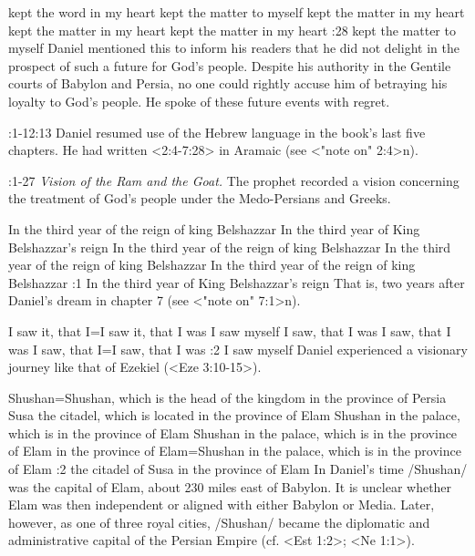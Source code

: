     {kept the word in my heart} %
    {kept the matter to myself} %
    {kept the matter in my heart} %
    {kept the matter in my heart} %
    {kept the matter in my heart} %
:28 {kept the  matter to myself}
Daniel mentioned this to inform his readers 
that he did not delight in the prospect of such a future for God's 
people. Despite his authority in the Gentile courts of Babylon and 
Persia, no one could rightly accuse him of betraying his loyalty to 
God's people. He spoke of these future events with regret.

:1-12:13 {}  Daniel resumed use of the Hebrew language in the 
book's last five chapters. He had written <2:4-7:28> in Aramaic (see 
<"note on" 2:4>n).

:1-27 {} {\it Vision of the Ram and the Goat.}\/ The prophet recorded a 
vision concerning the treatment of God's people under the Medo-Persians and Greeks.

    {In the third year of the reign of king Belshazzar} %
    {In the third year of King Belshazzar's reign} %
    {In the third year of the reign of king Belshazzar} %
    {In the third year of the reign of king Belshazzar} %
    {In the third year of the reign of king Belshazzar} %
:1 {In the third year of King Belshazzar's reign} That is, two 
years after Daniel's dream in chapter 7 (see <"note on" 7:1>n).

    {I saw it, that I}={I saw it, that I was} %
    {I saw myself} %
    {I saw, that I was} %
    {I saw, that I was} %
    {I saw, that I}={I saw, that I was} %
:2 {I saw myself} Daniel experienced a visionary journey like that 
of Ezekiel (<Eze 3:10-15>).

    {Shushan}={Shushan, which is the head of the kingdom in the province of Persia} %
    {Susa the citadel, which is located in the province of Elam} %
    {Shushan in the palace, which is in the province of Elam} %
    {Shushan in the palace, which is in the province of Elam} %
    {in the province of Elam}={Shushan in the palace, which is in the province of Elam} %
:2 {the citadel of Susa in the province of Elam}
In Daniel's time \x/Shushan/ was the capital of Elam, about 230 
miles east of Babylon. It is unclear whether Elam was then independent or aligned with either
Babylon or Media. Later, however,  as one of three royal cities, \x/Shushan/ became the diplomatic and
administrative capital of the Persian Empire (cf. <Est 1:2>; <Ne 1:1>).

